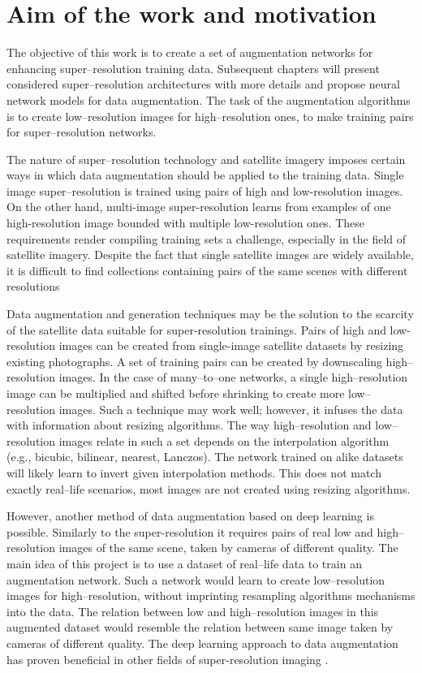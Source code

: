 \section{Aim of the work and motivation}
The objective of this work is to create a set of augmentation networks for
enhancing super--resolution training data.
Subsequent chapters will present considered super--resolution architectures
with more details and propose neural network models for data augmentation.
The task of the augmentation algorithms is to create low--resolution images for
high--resolution ones, to make training pairs for super--resolution networks. 

The nature of super--resolution technology and satellite imagery imposes certain
ways in which data augmentation should be applied to the training data.
Single image super--resolution is trained using pairs of high and low-resolution images.
On the other hand, multi-image super-resolution learns from examples of one high-resolution image bounded with multiple low-resolution ones.
These requirements render compiling training sets a challenge, especially in the
field of satellite imagery.
Despite the fact that single satellite images are widely available, it is difficult to find collections containing pairs of the same scenes with different resolutions

Data augmentation and generation techniques may be the solution to the scarcity of the satellite data suitable for super-resolution trainings.
Pairs of high and low-resolution images can be created from single-image satellite datasets by resizing existing photographs.
A set of training pairs can be created by downscaling high--resolution images.
In the case of many--to--one networks, a single high--resolution image can be
multiplied and shifted before shrinking to create more low--resolution images.
Such a technique may work well; however, it infuses the data with information
about resizing algorithms.
The way high--resolution and low--resolution images relate in such a set
depends on the interpolation algorithm (e.g., bicubic, bilinear,
nearest, Lanczos).
The network trained on alike datasets will likely learn to invert given
interpolation methods.
This does not match exactly real--life scenarios, most images are not created
using resizing algorithms.

However, another method of data augmentation based on deep learning is possible.
Similarly to the super-resolution it requires pairs of real low and high--resolution
images of the same scene, taken by cameras of different quality.
The main idea of this project is to use a dataset of real--life data to
train an augmentation network.
Such a network would learn to create low--resolution images for
high--resolution, without imprinting resampling algorithms mechanisms into the
data.
The relation between low and high--resolution images in this augmented
dataset would resemble the relation between same image taken by cameras of
different quality.
The deep learning approach to data augmentation has proven beneficial in other fields of super-resolution imaging \cite{bulat-2018-supergan}.

